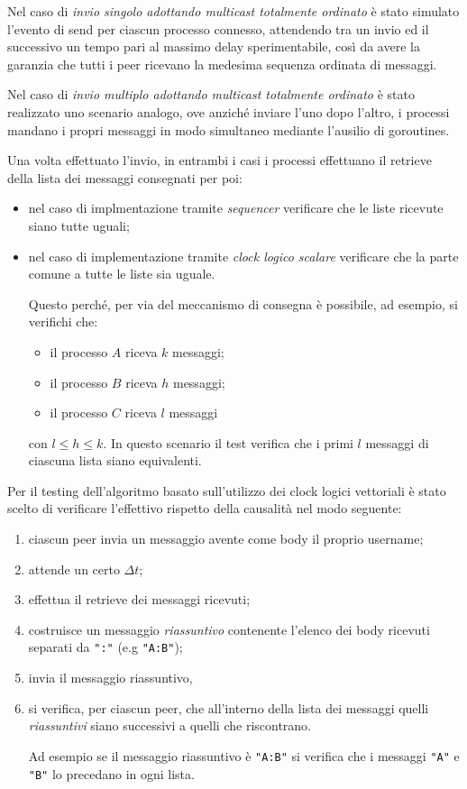\documentclass[conference]{IEEEtran}
\begin{document}
Nel caso di \textsl{invio singolo adottando multicast totalmente ordinato} è stato simulato l'evento di send per ciascun processo connesso, attendendo tra un invio ed il successivo un tempo pari al massimo delay sperimentabile, così da avere la garanzia che tutti i peer ricevano la medesima sequenza ordinata di messaggi.

Nel caso di \textsl{invio multiplo adottando multicast totalmente ordinato} è stato realizzato uno scenario analogo, ove anziché inviare l'uno dopo l'altro, i processi mandano i propri messaggi in modo simultaneo mediante l'ausilio di goroutines.

Una volta effettuato l'invio, in entrambi i casi i processi effettuano il retrieve della lista dei messaggi consegnati per poi:
\begin{itemize}
\item nel caso di implmentazione tramite \textsl{sequencer} verificare che le liste ricevute siano tutte uguali;
\item nel caso di implementazione tramite \textsl{clock logico scalare} verificare che la parte comune a tutte le liste sia uguale.

Questo perché, per via del meccanismo di consegna è possibile, ad esempio, si verifichi che:
\begin{itemize}
\item il processo $A$ riceva $k$ messaggi;
\item il processo $B$ riceva $h$ messaggi;
\item il processo $C$ riceva $l$ messaggi
\end{itemize}
con $l\leq h\leq k$. In questo scenario il test verifica che i primi $l$ messaggi di ciascuna lista siano equivalenti.
\end{itemize}

Per il testing dell'algoritmo basato sull'utilizzo dei clock logici vettoriali è stato scelto di verificare l'effettivo rispetto della causalità nel modo seguente:
\begin{enumerate}
\item ciascun peer invia un messaggio avente come body il proprio username;
\item attende un certo $\Delta t$;
\item effettua il retrieve dei messaggi ricevuti;
\item costruisce un messaggio \textit{riassuntivo} contenente l'elenco dei body ricevuti separati da \texttt{":"} (e.g \texttt{"A:B"});
\item invia il messaggio riassuntivo,
\item si verifica, per ciascun peer, che all'interno della lista dei messaggi quelli \textit{riassuntivi} siano successivi a quelli che riscontrano.

Ad esempio se il messaggio riassuntivo è \texttt{"A:B"} si verifica che i messaggi \texttt{"A"} e \texttt{"B"} lo precedano in ogni lista.
\end{enumerate}
\end{document}
